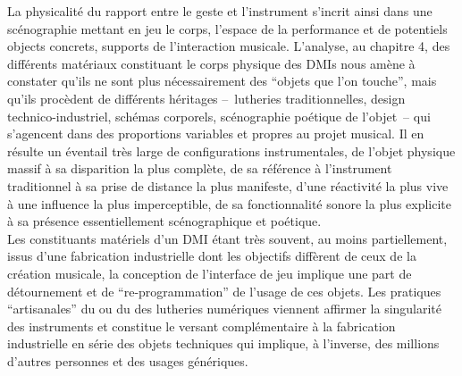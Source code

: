 
\noindent La physicalité du rapport entre le geste et l'instrument s'incrit ainsi dans une scénographie mettant en jeu le corps, l'espace de la performance et de potentiels objects concrets, supports de l'interaction musicale. L'analyse, au chapitre 4, des différents matériaux constituant le corps physique des \glspl{DMI} nous amène à constater qu'ils ne sont plus nécessairement des ``objets que l'on touche'', mais qu'ils procèdent de différents héritages --~lutheries traditionnelles, design technico-industriel, schémas corporels, scénographie poétique de l'objet~-- qui s'agencent dans des proportions variables et propres au projet musical. Il en résulte un éventail très large de configurations instrumentales, de l'objet physique massif à sa disparition la plus complète, de sa référence à l'instrument traditionnel à sa prise de distance la plus manifeste, d'une réactivité la plus vive à une influence la plus imperceptible, de sa fonctionnalité sonore la plus explicite à sa présence essentiellement scénographique et poétique.\\

\indent Les constituants matériels d'un \gls{DMI} étant très souvent, au moins partiellement, issus d'une fabrication industrielle dont les objectifs diffèrent de ceux de la création musicale, la conception de l'interface de jeu implique une part de détournement et de ``re-programmation'' de l'usage de ces objets. Les pratiques ``artisanales'' du  ou du  des lutheries numériques viennent affirmer la singularité des instruments et constitue le versant complémentaire à la fabrication industrielle en série des objets techniques qui implique, à l'inverse, des millions d'autres personnes et des usages génériques.






